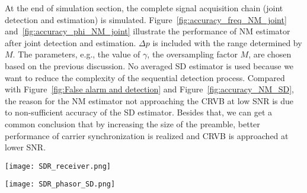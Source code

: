 At the end of simulation section, the complete signal acquisition chain (joint detection and estimation) is simulated.
Figure~\ref{fig:accuracy_freq_NM_joint} and~\ref{fig:accuracy_phi_NM_joint} illustrate the performance of NM estimator after joint detection and 
estimation. $\Delta p$ is included with the range determined by $M$.
The parameters, e.g., the value of $\gamma$, the oversampling factor $M$, are chosen based on the previous discussion.
No averaged SD estimator is used because we want to reduce the complexity of the sequential detection process.
Compared with Figure~\ref{fig:False alarm and detection} and Figure~\ref{fig:accuracy_NM_SD}, the reason for the NM estimator not approaching the CRVB at low SNR
is due to non-sufficient accuracy of the SD estimator. Besides that, we can get a common conclusion that by increasing
the size of the preamble, better performance of carrier synchronization is realized and CRVB is approached at lower SNR.

\begin{figure*}[t]
    \centerline{\texttt{[image: SDR\_receiver.png]}}
    \caption{Block diagram for implementing the proposed joint detection and estimation algorithm in Threading Building Blocks}
    \label{fig:SDR_receiver}
    \end{figure*}

\begin{figure*}[t]
    \centerline{\texttt{[image: SDR\_phasor\_SD.png]}}
    \caption{Block diagram for complexity-simpified computation of phasor estimator (the middle level of dashed area in Figure~\ref{fig:SDR_receiver})}
    \label{fig:SDR_phasor_SD}
    \end{figure*}